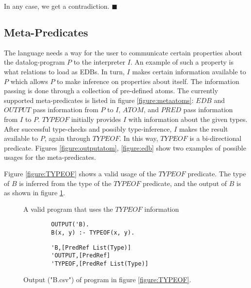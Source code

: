 In any case, we get a contradiction. $\blacksquare$

\subsection{Meta-Predicates}
The language needs a way for the user to communicate certain properties about the datalog-program $P$ to the interpreter $I$.
An example of such a property is what relations to load as EDBs.
In turn, $I$ makes certain information available to $P$ which allows $P$ to make inference on properties about itself.
The information passing is done through a collection of pre-defined atoms. The currently supported meta-predicates is listed in figure \ref{figure:metaatoms}: $EDB$ and $OUTPUT$ pass information from $P$ to $I$, $ATOM$, and $PRED$ pass information from $I$ to $P$. $TYPEOF$ initially provides $I$ with information about the given types. After successful type-checks and possibly type-inference, $I$ makes the result available to $P$, again through $TYPEOF$. In this way, $TYPEOF$ is a bi-directional predicate. Figures \ref{figure:outputatom}, \ref{figure:edb} show two examples of possible usages for the meta-predicates.

Figure \ref{figure:TYPEOF} shows a valid usage of the $TYPEOF$ predicate. The type of $B$ is inferred from the type of the $TYPEOF$ predicate, and the output of $B$ is as shown in figure \ref{figure:TYPEOFOUTPUT}.
\begin{figure}[!ht]
	\begin{minipage}[b]{.5\textwidth}
		\caption{A valid program that uses the $TYPEOF$ information}
		\begin{verbatim}
		OUTPUT('B).
		B(x, y) :- TYPEOF(x, y).
		\end{verbatim}
		\label{figure:TYPEOF}
	\end{minipage}
	\begin{minipage}[b]{.5\textwidth}
		\caption{Output ("B.csv") of program in figure \ref{figure:TYPEOF}.}
		\begin{verbatim}
		'B,[PredRef List(Type)]
		'OUTPUT,[PredRef]
		'TYPEOF,[PredRef List(Type)]
		\end{verbatim}
		
		\label{figure:TYPEOFOUTPUT}
	\end{minipage}
\end{figure}

